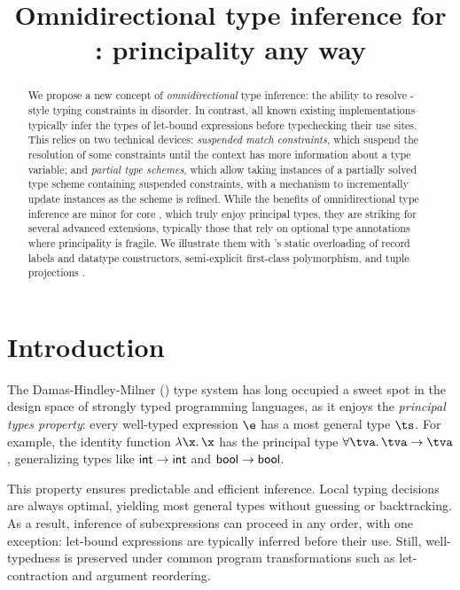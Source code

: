 \documentclass[acmsmall,screen,nonacm,review]{acmart}
\title{Omnidirectional type inference for \ML: principality any way}
\begin{document}
\begin{abstract}

We propose a new concept of \emph{omnidirectional} type inference: the
ability to resolve \ML-style typing constraints in disorder. In contrast,
all known existing implementations typically infer the types of
let-bound expressions before typechecking their use sites.
%
This relies on two technical devices: \emph{suspended match constraints},
which suspend the resolution of some constraints until the context has more
information about a type variable; and \emph{partial type schemes}, which
allow taking instances of a partially solved type scheme containing
suspended constraints, with a mechanism to incrementally update instances as
the scheme is refined.
%
While the benefits of omnidirectional type inference are minor for core \ML,
which truly enjoy principal types, they are striking for several advanced
\ML extensions, typically those that rely on optional type annotations where
principality is fragile.  We illustrate them with \OCaml's static
overloading of record labels and datatype constructors, semi-explicit
first-class polymorphism, and tuple projections \ala \SML.
\end{abstract}
\maketitle

\section{Introduction}
\label{sec/introduction}


The Damas-Hindley-Milner (\HM) \citep*{Damas-Milner/W@popl82} type system
has long occupied a sweet spot in the design space of strongly typed
programming languages, as it enjoys the \emph{principal types property}:
every well-typed expression $\e$ has a most general type $\ts$.
For example, the identity function
$\efun \x \x$ has the principal type $\tfor \tv \tv \to \tv$, generalizing
types like $\mathsf{int} \to \mathsf{int}$ and $\mathsf{bool} \to \mathsf{bool}$.


This property ensures predictable and efficient inference. Local typing
decisions are always optimal, yielding most general types without guessing
or backtracking. As a result, inference of subexpressions can proceed in any
order, with one exception: let-bound expressions are typically inferred
before their use. Still, well-typedness is preserved under common program
transformations such as let-contraction and argument reordering.
\end{document}
